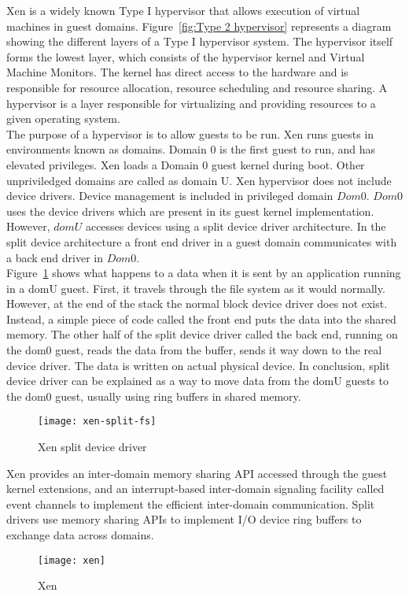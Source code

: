 Xen\cite{Barham:2003:XAV:1165389.945462} is a widely known Type I hypervisor that allows execution of virtual machines in guest domains\cite{King_operatingsystem}. Figure~\ref{fig:Type 2 hypervisor} represents a diagram showing the different layers of a Type I hypervisor system. The hypervisor itself forms the lowest layer, which consists of the hypervisor kernel and Virtual Machine Monitors. The kernel has direct access to the hardware and is responsible for resource allocation, resource scheduling and resource sharing. A hypervisor is a layer responsible for virtualizing and providing resources to a given operating system.
\\
The purpose of a hypervisor is to allow guests to be run. Xen runs guests in environments known as domains. Domain 0 is the first guest to run, and has elevated privileges. Xen loads a Domain 0 guest kernel during boot. Other unpriviledged domains are called as domain U. Xen hypervisor does not include device drivers. Device management is included in privileged domain $Dom 0$. $Dom 0$ uses the device drivers which are present in its guest kernel implementation. However, $dom U$ accesses devices using a split device driver architecture. In the split device architecture a front end driver in a guest domain communicates with a back end driver in $Dom 0$.
\\
Figure~\ref{xen-split2} shows what happens to a data when it is sent by an application running in a domU guest. First, it travels through the file system as it would normally. However, at the end of the stack the normal block device driver does not exist. Instead, a simple piece of code called the front end puts the data into the shared memory. The other half of the split device driver called the back end, running on the dom0 guest, reads the data from the buffer, sends it way down to the real device driver. The data is written on actual physical device. In conclusion, split device driver can be explained as a way to move data from the domU guests to the dom0 guest, usually using ring buffers in shared memory\cite{Chisnall:2007:DGX:1407351}.
\begin{figure}[!h]
\centering
\texttt{[image: xen-split-fs]}
\caption{Xen split device driver}
\label{xen-split2}
\end{figure}

Xen provides an inter-domain memory sharing API accessed through the guest kernel extensions, and an interrupt-based inter-domain signaling facility called event channels to implement the efficient inter-domain communication. Split drivers use memory sharing APIs to implement I/O device ring buffers to exchange data across domains.
\\
\begin{figure}[!h]
\centering
\texttt{[image: xen]}
\caption{Xen}
\label{xen}
\end{figure}

